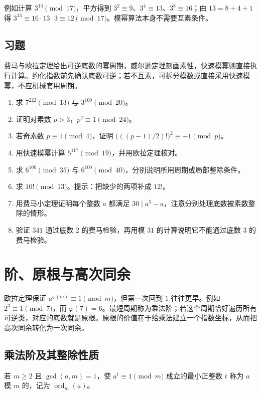 \documentclass[UTF8,12pt,a4paper,fontset=fandol]{ctexbook}
\begin{document}
例如计算 $3^{13}\pmod{17}$，平方得到 $3^2\equiv9$、$3^4\equiv13$、$3^8\equiv16$；由 $13=8+4+1$ 得 $3^{13}\equiv16\cdot13\cdot3\equiv12\pmod{17}$。模幂算法本身不需要互素条件。

\section{习题}

费马与欧拉定理给出可逆底数的幂周期，威尔逊定理刻画素性，快速模幂则直接执行计算。约化指数前先确认底数可逆；若不互素，可拆分模数或直接采用快速模幂，不应机械套用周期。

\begin{enumerate}
 \item 求 $7^{222}\pmod{13}$ 与 $3^{100}\pmod{20}$。
 \item 证明对素数 $p>3$，$p^2\equiv1\pmod{24}$。
 \item 若奇素数 $p\equiv1\pmod4$，证明 $\bigl(((p-1)/2)!\bigr)^2\equiv-1\pmod p$。
 \item 用快速模幂计算 $5^{117}\pmod{19}$，并用欧拉定理核对。
 \item\label{ex:classical-noncoprime} 求 $6^{100}\pmod{35}$ 与 $6^{100}\pmod{40}$，分别说明所用周期或局部整除条件。
 \item\label{ex:classical-factorial} 求 $10!\pmod{13}$。提示：把缺少的两项补成 $12!$。
 \item\label{ex:classical-fermat-all} 用费马小定理证明每个整数 $a$ 都满足 $30\mid a^5-a$，注意分别处理底数被素数整除的情形。
 \item\label{ex:classical-pseudoprime} 验证 $341$ 通过底数 $2$ 的费马检验，再用模 $31$ 的计算说明它不能通过底数 $3$ 的费马检验。
\end{enumerate}

\chapter{阶、原根与高次同余}
\label{ch:primitive-roots}

欧拉定理保证 $a^{\varphi(m)}\equiv1\pmod m$，但第一次回到 $1$ 往往更早。例如 $2^3\equiv1\pmod7$，而 $\varphi(7)=6$。最短周期称为乘法阶；若这个周期恰好遍历所有可逆类，对应的底数就是原根。原根的价值在于给乘法建立一个指数坐标，从而把高次同余转化为一次同余。

\section{乘法阶及其整除性质}

\begin{definition}
若 $m\ge2$ 且 $\gcd(a,m)=1$，使 $a^t\equiv1\pmod m$ 成立的最小正整数 $t$ 称为 $a$ 模 $m$ 的，记为 $\operatorname{ord}_m(a)$。
\end{definition}
\end{document}
